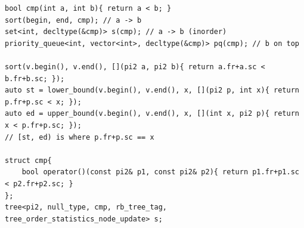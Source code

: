 \begin{verbatim}
bool cmp(int a, int b){ return a < b; }
sort(begin, end, cmp); // a -> b
set<int, decltype(&cmp)> s(cmp); // a -> b (inorder)
priority_queue<int, vector<int>, decltype(&cmp)> pq(cmp); // b on top

sort(v.begin(), v.end(), [](pi2 a, pi2 b){ return a.fr+a.sc < b.fr+b.sc; });
auto st = lower_bound(v.begin(), v.end(), x, [](pi2 p, int x){ return p.fr+p.sc < x; });
auto ed = upper_bound(v.begin(), v.end(), x, [](int x, pi2 p){ return x < p.fr+p.sc; });
// [st, ed) is where p.fr+p.sc == x

struct cmp{
	bool operator()(const pi2& p1, const pi2& p2){ return p1.fr+p1.sc < p2.fr+p2.sc; }
};
tree<pi2, null_type, cmp, rb_tree_tag, tree_order_statistics_node_update> s;
\end{verbatim}